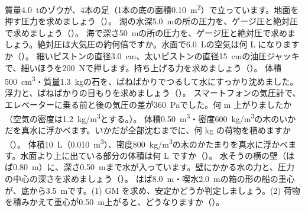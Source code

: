 \bkendproblems
{}
\bkproblem 質量\qty{4.0}{t}のゾウが、4本の足（1本の底の面積\qty{0.10}{m^2}）で立っています。地面を押す圧力を求めましょう（\nobreak{}\nobreak）。
\bkproblem 湖の水深\qty{5.0}{m}の所の圧力を、ゲージ圧と絶対圧で求めましょう（\nobreak{}\nobreak）。
\bkproblem 海で深さ\qty{50}{m}の所の圧力を、ゲージ圧と絶対圧で求めましょう。絶対圧は大気圧の約何倍ですか。水面で\qty{6.0}{L}の空気は何 L になりますか\mbox{（\nobreak{}\nobreak）}。
\bkproblem 細いピストンの直径\qty{3.0}{cm}、太いピストンの直径\qty{15}{cm}の油圧ジャッキで、細いほうを\qty{200}{N}で押します。持ち上げる力を求めましょう（\nobreak{}\nobreak）。
\bkproblem 体積\qty{500}{cm^3}・質量\qty{1.3}{kg}の石を、ばねばかりでつるして水にすっかり沈めました。浮力と、ばねばかりの目もりを求めましょう（\nobreak{}\nobreak）。
\bkproblem スマートフォンの気圧計で、エレベーターに乗る前と後の気圧の差が\qty{360}{Pa}でした。何 m 上がりましたか（空気の密度は\qty{1.2}{kg/m^3}とする。\nobreak）。
\bkproblem 体積\qty{0.50}{m^3}・密度\qty{600}{kg/m^3}の木のいかだを真水に浮かべます。いかだが全部沈むまでに、何 kg の荷物を積めますか（\nobreak{}\nobreak）。
\bkproblem 体積\qty{10}{L}（\qty{0.010}{m^3}）、密度\qty{800}{kg/m^3}の木のかたまりを真水に浮かべます。水面より上に出ている部分の体積は何 L ですか（\nobreak{}\nobreak）。
\bkproblem 水そうの横の壁（はば\qty{0.80}{m}）に、深さ\qty{0.50}{m}まで水が入っています。壁にかかる水の力と、圧力の中心の深さを求めましょう（\nobreak{}\nobreak）。
\bkproblem はば\qty{8.0}{m}・喫水\qty{2.0}{m}の箱の形の船の重心が、底から\qty{3.5}{m}です。(1) GM を求め、安定かどうか判定しましょう。(2) 荷物を積みかえて重心が\qty{0.50}{m}上がると、どうなりますか（\nobreak{}\nobreak）。
